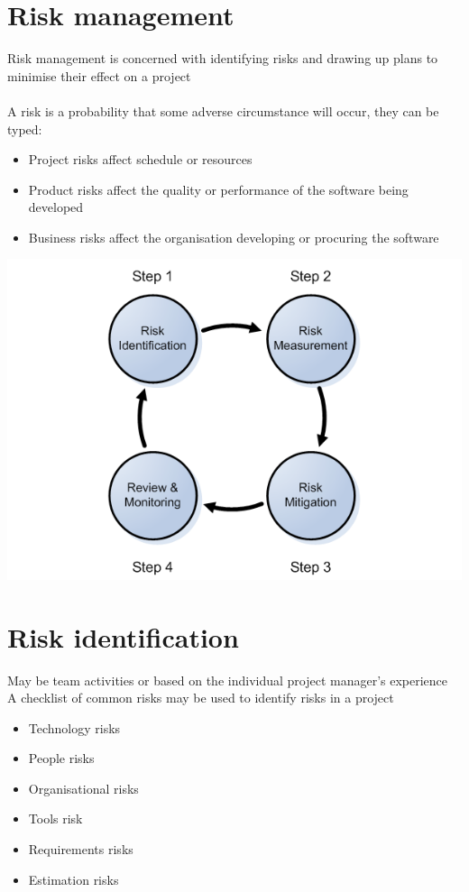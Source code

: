 \documentclass{article}[18pt]
\begin{document}
\section{Risk management}
Risk management is concerned with identifying risks and drawing up plans to minimise their effect on a project\\
\\
A risk is a probability that some adverse circumstance will occur, they can be typed:
\begin{itemize}
	\item Project risks affect schedule or resources
	\item Product risks affect the quality or performance of the software being developed
	\item Business risks affect the organisation developing or procuring the software
\end{itemize}
\begin{center}
	\includegraphics[scale=0.5]{"risk management"}
\end{center}
\section{Risk identification}
May be team activities or based on the individual project manager's experience\\
A checklist of common risks may be used to identify risks in a project
\begin{itemize}
	\item Technology risks
	\item People risks
	\item Organisational risks
	\item Tools risk
	\item Requirements risks
	\item Estimation risks
\end{itemize}
\end{document}
